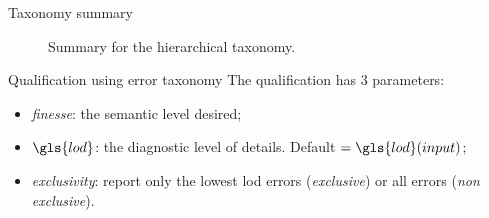 \documentclass{beamer}
\begin{document}
            \begin{frame}{Taxonomy summary}
                \begin{figure}
                    
                    \caption{\label{fig::tree_taxonomy} Summary for the hierarchical taxonomy.}
                \end{figure}
            \end{frame}
            \begin{frame}{Qualification using error taxonomy}
                The qualification has $3$ parameters:
                \begin{itemize}[label=$\blacktriangleright$, font=\color{IGNGreen}]
                    \item<1-> \emph{finesse}: the semantic level desired;
                    \item<2-> $\gls{lod}$: the diagnostic level of details. Default $ = \gls{lod}(input) $;
                    \item<3-> \emph{exclusivity}: report only the lowest \gls{lod} errors (\emph{exclusive}) or all errors (\emph{non exclusive}).
                \end{itemize}
            \end{frame}
\end{document}
